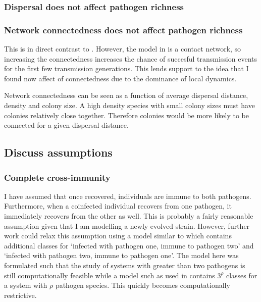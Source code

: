 \subsubsection{Dispersal does not affect pathogen richness}



\subsubsection{Network connectedness does not affect pathogen richness}

This is in direct contrast to \cite{campos2006pathogen}. 
However, the model in \cite{campos2006pathogen} is a contact network, so increasing the connectedness increases the chance of succesful transmission events for the first few transmission generations.
This lends support to the idea that I found now affect of connectedness due to the dominance of local dynamics.

Network connectedness can be seen as a function of average dispersal distance, density and colony size.
A high density species with small colony sizes must have colonies relatively close together.
Therefore colonies would be more likely to be connected for a given dispersal distance. 


\subsection{Discuss assumptions}

\subsubsection{Complete cross-immunity}

I have assumed that once recovered, individuals are immune to both pathogens. 
Furthermore, when a coinfected individual recovers from one pathogen, it immediately recovers from the other as well.
This is probably a fairly reasonable assumption given that I am modelling a newly evolved strain.
However, further work could relax this assumption using a model similar to \cite{poletto2015characterising} which contains additional classes for `infected with pathogen one, immune to pathogen two' and `infected with pathogen two, immune to pathogen one'.
The model here was formulated such that the study of systems with greater than two pathogens is still computationally feasible while a model such as used in \cite{poletto2015characterising} contains $3^\rho$ classes for a system with $\rho$ pathogen species.
This quickly becomes computationally restrictive.

